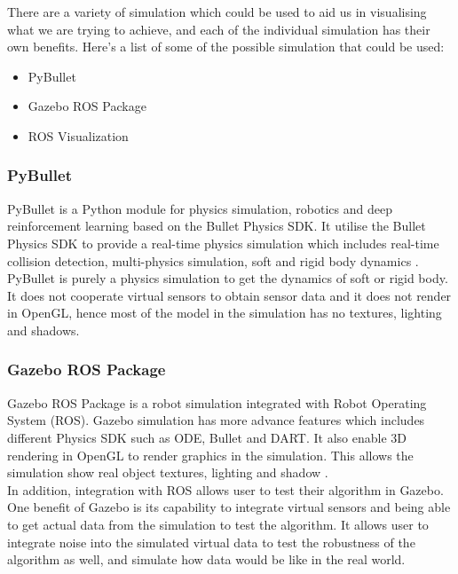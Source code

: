\documentclass[12pt,A4]{article}
\begin{document}
	There are a variety of simulation which could be used to aid us in visualising what we are trying to achieve, and each of the individual simulation has their own benefits. Here's a list of some of the possible simulation that could be used:
	
	\begin{itemize}
		\item PyBullet
		\item Gazebo ROS Package
		\item ROS Visualization
	\end{itemize}
	
	\subsubsection{PyBullet}
	\hfill\begin{minipage}{\dimexpr\textwidth-1cm}
	PyBullet is a Python module for physics simulation, robotics and deep reinforcement learning based on the Bullet Physics SDK. It utilise the Bullet Physics SDK to provide a real-time physics simulation which includes real-time collision detection, multi-physics simulation, soft and rigid body dynamics \citep{pybullet}.\\ 
	
	PyBullet is purely a physics simulation to get the dynamics of soft or rigid body. It does not cooperate virtual sensors to obtain sensor data and it does not render in OpenGL, hence most of the model in the simulation has no textures, lighting and shadows.\\
	\end{minipage}
	
	\subsubsection{Gazebo ROS Package}
	\hfill\begin{minipage}{\dimexpr\textwidth-1cm}
	Gazebo ROS Package is a robot simulation integrated with Robot Operating System (ROS). Gazebo simulation has more advance features which includes different Physics SDK such as ODE, Bullet and DART. It also enable 3D rendering in OpenGL to render graphics in the simulation. This allows the simulation show real object textures, lighting and shadow \citep{Gazebo}.\\
	
	In addition, integration with ROS allows user to test their algorithm in Gazebo. One benefit of Gazebo is its capability to integrate virtual sensors and being able to get actual data from the simulation to test the algorithm. It allows user to integrate noise into the simulated virtual data to test the robustness of the algorithm as well, and simulate how data would be like in the real world.\\
	\end{minipage}
	
\end{document}
